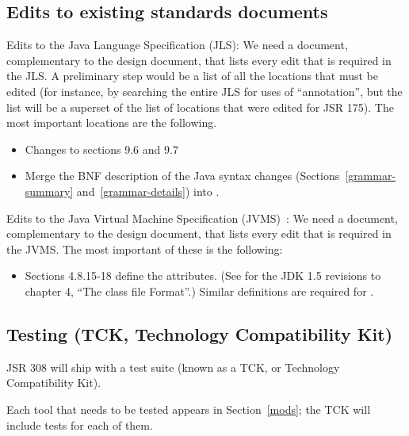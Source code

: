 \documentclass[10pt]{article}
\begin{document}
\subsection{Edits to existing standards documents\label{edits-to-standards}}

Edits to the Java Language Specification (JLS):
      We need a document, complementary to the design document, that lists
      every edit that is required in the JLS.
      A preliminary step would be a list of all the locations that must be
      edited (for instance, by searching the entire JLS for uses of
      ``annotation'', but the list will be a superset of the list of
      locations that were edited for
      JSR 175).
      The most important locations are the following.
\begin{itemize}
\item
Changes to sections 9.6 and 9.7
\item
Merge the BNF description of the Java syntax changes
(Sections~\ref{grammar-summary} and~\ref{grammar-details})
into .
\end{itemize}

Edits to the Java Virtual Machine Specification (JVMS)~\cite{LindholmY99,LindholmY99:CFF5}:
      We need a document, complementary to the design document, that lists
      every edit that is required in the JVMS\@.
      The most important of these is the following:
\begin{itemize}
\item
        Sections 4.8.15-18 define the \RuntimeInOrVisibleAnnotationsOrParameterAnnotations
        attributes.  (See
        for the JDK 1.5 revisions to chapter 4, ``The class file Format''.)
        Similar definitions are required for \RuntimeInOrVisibleTypeAnnotations.
\end{itemize}



\subsection{Testing (TCK, Technology Compatibility Kit)\label{testing}}

JSR 308 will ship with a test suite (known as a TCK, or Technology
Compatibility Kit).

Each tool that needs to be tested appears in Section~\ref{mods};
the TCK will include tests for each of them.
\end{document}
